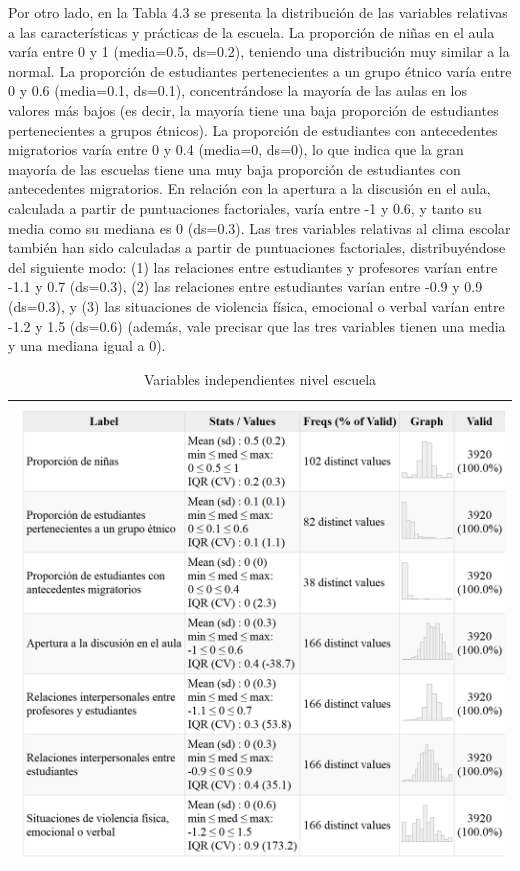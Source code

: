 \documentclass[12pt,twoside]{templates/facsothesis}
\begin{document}
Por otro lado, en la Tabla 4.3 se presenta la distribución de las variables relativas a las características y prácticas de la escuela. La proporción de niñas en el aula varía entre 0 y 1 (media=0.5, ds=0.2), teniendo una distribución muy similar a la normal. La proporción de estudiantes pertenecientes a un grupo étnico varía entre 0 y 0.6 (media=0.1, ds=0.1), concentrándose la mayoría de las aulas en los valores más bajos (es decir, la mayoría tiene una baja proporción de estudiantes pertenecientes a grupos étnicos). La proporción de estudiantes con antecedentes migratorios varía entre 0 y 0.4 (media=0, ds=0), lo que indica que la gran mayoría de las escuelas tiene una muy baja proporción de estudiantes con antecedentes migratorios. En relación con la apertura a la discusión en el aula, calculada a partir de puntuaciones factoriales, varía entre -1 y 0.6, y tanto su media como su mediana es 0 (ds=0.3). Las tres variables relativas al clima escolar también han sido calculadas a partir de puntuaciones factoriales, distribuyéndose del siguiente modo: (1) las relaciones entre estudiantes y profesores varían entre -1.1 y 0.7 (ds=0.3), (2) las relaciones entre estudiantes varían entre -0.9 y 0.9 (ds=0.3), y (3) las situaciones de violencia física, emocional o verbal varían entre -1.2 y 1.5 (ds=0.6) (además, vale precisar que las tres variables tienen una media y una mediana igual a 0).

\begin{longtable}[]{@{}l@{}}
\caption{\label{tab:unnamed-chunk-8}Variables independientes nivel escuela}\tabularnewline
\toprule
\endhead
\includegraphics[width=\textwidth,height=0.5\textheight]{input/images/desc01_indep_col.png} \\
\bottomrule
\end{longtable}
\end{document}
